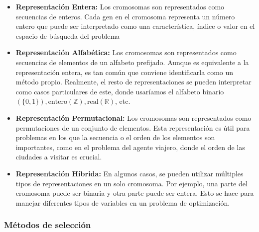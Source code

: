 \begin{itemize}
    \item \textbf{Representación Entera:} Los cromosomas son representados como secuencias 
    de enteros. Cada gen en el cromosoma representa un número entero que puede ser 
    interpretado como una característica, índice o valor en el espacio de búsqueda del problema

    \item \textbf{Representación Alfabética:} Los cromosomas son representados como secuencias 
    de elementos de un alfabeto prefijado. Aunque es equivalente a la representación entera, 
    es tan común que conviene identificarla como un método propio. Realmente, el resto de 
    representaciones se pueden interpretar como casos particulares de este, donde usaríamos 
    el alfabeto binario $(\{0,1\}), \text{entero} (\mathbb{Z}), \text{real} (\mathbb{R})$, etc.

    \item \textbf{Representación Permutacional:} Los cromosomas son representados como 
    permutaciones de un conjunto de elementos. Esta representación es útil para problemas en los 
    que la secuencia o el orden de los elementos son importantes, como en el problema del 
    agente viajero, donde el orden de las ciudades a visitar es crucial.

    \item \textbf{Representación Híbrida:} En algunos casos, se pueden utilizar múltiples tipos de 
    representaciones en un solo cromosoma. Por ejemplo, una parte del cromosoma puede ser binaria y 
    otra parte puede ser entera. Esto se hace para manejar diferentes tipos de variables en un problema 
    de optimización.
\end{itemize}

\subsubsection*{Métodos de selección}

